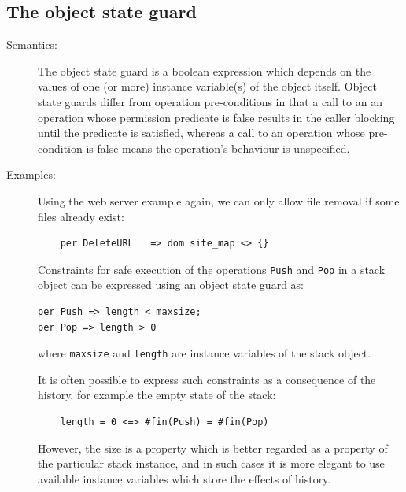 \documentclass{overturerepchap}
\begin{document}
\subsection{The object state guard}
\begin{description}
\item[Semantics:] 
The object state guard is a boolean expression which depends on the values of
one (or more) instance variable(s) of the object itself. Object state
guards differ from operation pre-conditions in that a call to an an
operation whose permission predicate is false results in the caller
blocking until the predicate is satisfied, whereas a call to an
operation whose pre-condition is false means the operation's behaviour
is unspecified.

\item[Examples:] 
Using the web server example again, we can only allow file removal if
some files already exist:
\begin{lstlisting}
    per DeleteURL   => dom site_map <> {}
\end{lstlisting}

Constraints for safe execution of the operations {\tt Push} and {\tt Pop}
in a stack object can be expressed using an object state guard as:
\begin{lstlisting}
per Push => length < maxsize;
per Pop => length > 0
\end{lstlisting}
where {\tt maxsize} and {\tt length} are instance variables of
the stack object.

It is often possible to express such constraints as a
consequence of the history,
for example the empty state of the stack:
\begin{lstlisting}
    length = 0 <=> #fin(Push) = #fin(Pop)
\end{lstlisting}
However, the size is a property which is better regarded as a
property of the particular stack instance, and in such cases it is
more elegant to use available instance variables which store the effects
of history.

%
\end{description}
\end{document}
